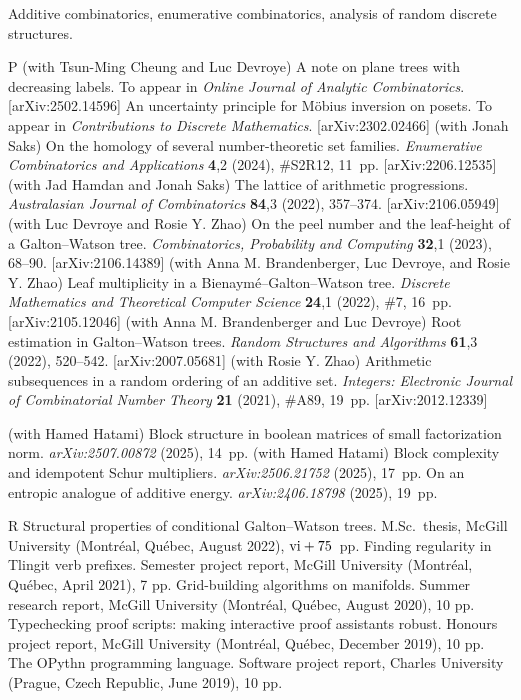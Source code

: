 Additive combinatorics, enumerative combinatorics, analysis of random discrete structures.


\begingroup\frenchspacing
{}
\pubbegin P
\papitem (with Tsun-Ming Cheung and Luc Devroye)
A note on plane trees with decreasing labels.
To appear in {\sl Online Journal of Analytic Combinatorics}.
[arXiv:2502.14596]
\papitem An uncertainty principle for M\"obius inversion on posets.
To appear in {\sl Contributions to Discrete Mathematics}.
[arXiv:2302.02466]
\papitem (with Jonah Saks)
On the homology of several number-theoretic set families.
{\sl Enumerative Combinatorics and Applications}\/ {\bf 4},2 (2024), \#S2R12, 11~pp.
[arXiv:2206.12535]
\papitem (with Jad Hamdan and Jonah Saks)
The lattice of arithmetic progressions.
{\sl Australasian Journal of Combinatorics}\/ {\bf 84},3 (2022), 357--374.
[arXiv:2106.05949]
\papitem (with Luc Devroye and Rosie Y. Zhao)
On the peel number and the leaf-height of a Galton--Watson tree.
{\sl Combinatorics, Probability and Computing}\/ {\bf 32},1 (2023), 68--90.
[arXiv:2106.14389]
\papitem (with Anna M. Brandenberger, Luc Devroye, and Rosie Y. Zhao)
Leaf multiplicity in a Bienaym\'e--Galton--Watson tree. {\sl Discrete Mathematics
and Theoretical Computer Science}\/ {\bf 24},1 (2022), \#7, 16~pp.
[arXiv:2105.12046]
\papitem (with Anna M. Brandenberger and Luc Devroye)
Root estimation in Galton--Watson trees. {\sl Random Structures and Algorithms}\/ {\bf 61},3 (2022), 520--542.
[arXiv:2007.05681]
\papitem (with Rosie Y. Zhao)
Arithmetic subsequences in a random ordering of an additive set.
{\sl Integers: Electronic Journal of Combinatorial Number Theory}\/ {\bf 21} (2021), \#A89, 19~pp.
[arXiv:2012.12339]


\begingroup\frenchspacing\parindent=10pt
\thing (with Hamed Hatami)
Block structure in boolean matrices of small factorization norm.
{\sl arXiv:2507.00872} (2025), 14~pp.
\smallskip
\thing (with Hamed Hatami)
Block complexity and idempotent Schur multipliers.
{\sl arXiv:2506.21752} (2025), 17~pp.
\smallskip
\thing
On an entropic analogue of additive energy.
{\sl arXiv:2406.18798} (2025), 19~pp.
\endgroup

\goodbreak
{}

\pubbegin R
\repitem Structural properties of conditional Galton--Watson trees. M.Sc.~thesis, McGill University
(Montr\'eal, Qu\'ebec, August 2022), $\hbox{\rm vi} + 75$~pp.
\repitem Finding regularity in Tlingit verb prefixes. Semester project report, McGill University
(Montr\'eal, Qu\'ebec, April 2021), 7 pp.
\repitem Grid-building algorithms on manifolds. Summer research report, McGill University (Montr\'eal, Qu\'ebec,
August 2020), 10 pp.
\repitem Typechecking proof scripts: making interactive proof assistants robust.
Honours project report, McGill University (Montr\'eal, Qu\'ebec, December 2019), 10 pp.
\repitem The OPythn programming language. Software project report, Charles University (Prague,
Czech Republic, June 2019), 10 pp.

